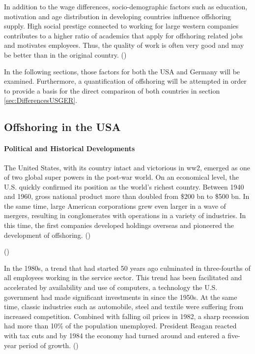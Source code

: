 In addition to the wage differences, socio-demographic factors such as education, motivation and age distribution in developing countries influence offshoring supply. High social prestige connected to working for large western companies contributes to a higher ratio of academics that apply for offshoring related jobs and motivates employees. Thus, the quality of work is often very good and may be better than in the original country. (\cite[p. 93]{Jahns.2007})

In the following sections, those factors for both the USA and Germany will be examined. Furthermore, a quantification of offshoring will be attempted in order to provide a basis for the direct comparison of both countries in section \ref{sec:DifferencesUSGER}.

\subsection{Offshoring in the USA}
\label{sec:OffshoringUS}

\paragraph{Political and Historical Developments}
The United States, with its country intact and victorious in \gls{ww2}, emerged as one of two global super powers in the post-war world. On an economical level, the U.S. quickly confirmed its position as the world's richest country. Between 1940 and 1960, gross national product more than doubled from \$200 \nolinebreak bn to \$500 \nolinebreak bn. In the same time, large American corporations grew even larger in a wave of mergers, resulting in conglomerates with operations in a variety of industries. In this time, the first companies developed holdings overseas and pioneered the development of offshoring. (\cite{Winkler.1994b})

(\cite{Winkler.1994})


In the 1980s, a trend that had started 50 years ago culminated in three-fourths of all employees working in the service sector. This trend has been facilitated and accelerated by availability and use of computers, a technology the U.S. government had made significant investments in since the 1950s. At the same time, classic industries such as automobile, steel and textile were suffering from increased competition. Combined with falling oil prices in 1982, a sharp recession had more than 10\% of the population unemployed. President Reagan reacted with tax cuts and by 1984 the economy had turned around and entered a five-year period of growth.
(\cite{Winkler.1994c})

